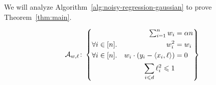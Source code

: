 


















We will analyze Algorithm~\ref{alg:noisy-regression-gaussian} to prove Theorem~\ref{thm:main}.

\begin{equation}
  \mathcal A_{w,\ell}\colon
  \left \{
    \begin{aligned}
      &&
      \textstyle\sum_{i=1}^n w_i
      &= \alpha n\\
      &\forall i\in [n].
      & w_i^2
      & =w_i \\
      &\forall i\in [n].
      & w_i \cdot (y_i - \langle x_i,\ell\rangle)
      & = 0\\
      &
      &\sum_{i \leqslant d} \ell_i^2 \leqslant 1\\
    \end{aligned}
  \right \}
\end{equation} 



